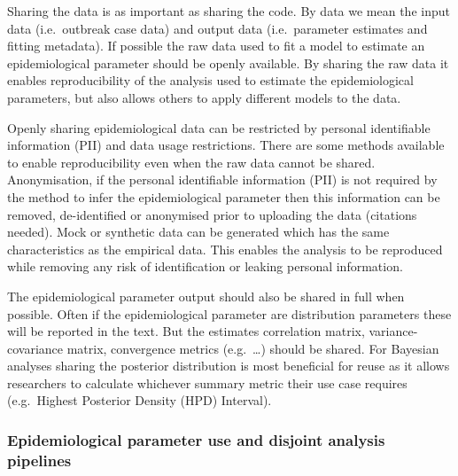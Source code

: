 \documentclass[
  10pt,
  letterpaper,
]{article}
\begin{document}
Sharing the data is as important as sharing the code. By data we mean
the input data (i.e.~outbreak case data) and output data (i.e.~parameter
estimates and fitting metadata). If possible the raw data used to fit a
model to estimate an epidemiological parameter should be openly
available. By sharing the raw data it enables reproducibility of the
analysis used to estimate the epidemiological parameters, but also
allows others to apply different models to the data.

Openly sharing epidemiological data can be restricted by personal
identifiable information (PII) and data usage restrictions. There are
some methods available to enable reproducibility even when the raw data
cannot be shared. Anonymisation, if the personal identifiable
information (PII) is not required by the method to infer the
epidemiological parameter then this information can be removed,
de-identified or anonymised prior to uploading the data (citations
needed). Mock or synthetic data can be generated which has the same
characteristics as the empirical data. This enables the analysis to be
reproduced while removing any risk of identification or leaking personal
information.

The epidemiological parameter output should also be shared in full when
possible. Often if the epidemiological parameter are distribution
parameters these will be reported in the text. But the estimates
correlation matrix, variance-covariance matrix, convergence metrics
(e.g.~\ldots) should be shared. For Bayesian analyses sharing the
posterior distribution is most beneficial for reuse as it allows
researchers to calculate whichever summary metric their use case
requires (e.g.~Highest Posterior Density (HPD) Interval).

\subsubsection{Epidemiological parameter use and disjoint analysis
pipelines}\label{epidemiological-parameter-use-and-disjoint-analysis-pipelines}
\end{document}
